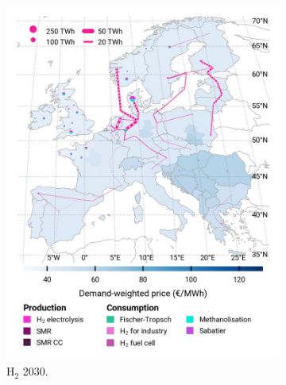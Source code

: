 \documentclass[pdflatex,sn-nature]{sn-jnl}
\theoremstyle{thmstyleone}%
\theoremstyle{thmstyletwo}%
\theoremstyle{thmstylethree}%
\begin{document}
\begin{figure}[htbp]
  \centering
  \begin{subfigure}[t]{0.32\textwidth}
      \vspace{0pt}
      \includegraphics[width=1\textwidth]{figures/pci___base_s_adm___2030-balance_map_H2.jpg}
      \caption{H$_2$ 2030.}
      \label{fig:PCI_lt_2030_h2}
  \end{subfigure}
  \begin{subfigure}[t]{0.32\textwidth}
      \vspace{0pt}

\end{subfigure}
\end{figure}
\end{document}
